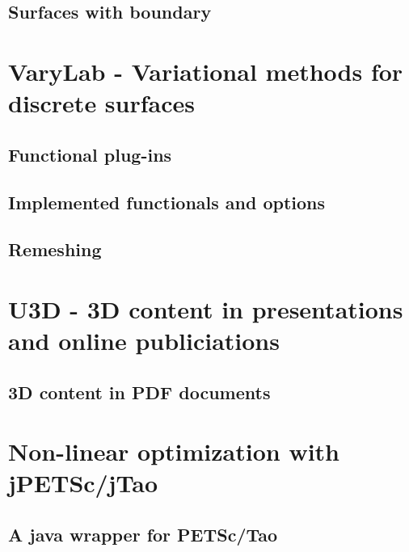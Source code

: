 \subsection{Surfaces with boundary}

\section{{\sc VaryLab} - Variational methods for discrete surfaces}
\label{sec:varylab}
\subsection{Functional plug-ins}
\subsection{Implemented functionals and options}
\subsection{Remeshing}

\section{U3D - 3D content in presentations and online publiciations}
\label{sec:u3d}
\subsection{3D content in PDF documents}

\section{Non-linear optimization with jPETSc/jTao}
\label{sec:jpetsctao}
\subsection{A java wrapper for PETSc/Tao}

